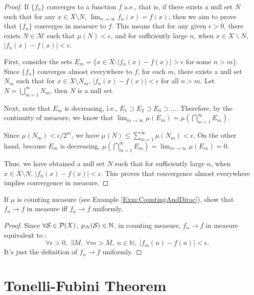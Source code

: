 \begin{proof}
    If $\{f_n\}$ converges to a function $f$ a.e., 
    that is, if there exists a null set $N$ such that for any 
    $x \in X\setminus N$, $\lim_{n \to \infty} f_n(x) = f(x)$, 
    then we aim to prove that $\{f_n\}$ converges in measure to $f$. 
    This means that for any given $\epsilon > 0$, 
    there exists $N \in \mathcal{M}$ such that $\mu(N) < \epsilon$, 
    and for sufficiently large $n$, when $x \in X\backslash N$, 
    $|f_n(x) - f(x)| < \epsilon$.

    First, consider the sets $E_m = \{x \in X : |f_n(x) - f(x)| > 
    \epsilon \text{ for some } n > m\}$. Since $\{f_n\}$ converges 
    almost everywhere to $f$, for each $m$, there exists a null set 
    $N_m$ such that for $x \in X\setminus N_m$, $|f_n(x) - f(x)| < 
    \epsilon$ for all $n > m$. Let $N = \bigcup_{m=1}^\infty N_m$, 
    then $N$ is a null set.

    Next, note that $E_m$ is decreasing, i.e., $E_1 \supset E_2 
    \supset E_3 \supset \dots$. Therefore, by the continuity of measure, 
    we know that $\lim_{m \to \infty} \mu(E_m) = \mu(\bigcap_{m=1}^\infty
    E_m)$.

    Since $\mu(N_m) < \epsilon/2^m$, we have $\mu(N) \leq 
    \sum_{m=1}^\infty \mu(N_m) < \epsilon$. On the other hand, 
    because $E_m$ is decreasing, $\mu(\bigcap_{m=1}^\infty E_m) = 
    \lim_{m \to \infty} \mu(E_m) = 0$.

    Thus, we have obtained a null set $N$ such that for sufficiently 
    large $n$, when $x \in X\setminus N$, $|f_n(x) - f(x)| < \epsilon$. 
    This proves that convergence almost everywhere implies convergence 
    in measure.
\end{proof}
\begin{exc}
    If $\mu$ is counting measure 
    (see Example \ref{Exm:CountingAndDirac}), show that 
    $f_{n}\rightarrow f$ in measure iff $f_{n}\rightarrow f$ uniformly.
\end{exc}
\begin{proof}
    Since $\forall\mathcal{S}\in\mathcal{P}(X)$, 
    $\mu_{N}(\mathcal{S})\in\mathbb{N}$, 
    in counting measure, $f_n\rightarrow f$ in measure equivalent to :
    \begin{displaymath}
        \forall \epsilon>0,\;\exists M,\;\forall m>M,\;n\in\mathbb{N},\;
        |f_{m}(n)-f(n)|<\epsilon.
    \end{displaymath}
    It's just the definition of $f_{n}\rightarrow f$ uniformly.
\end{proof}
\section{Tonelli-Fubini Theorem}